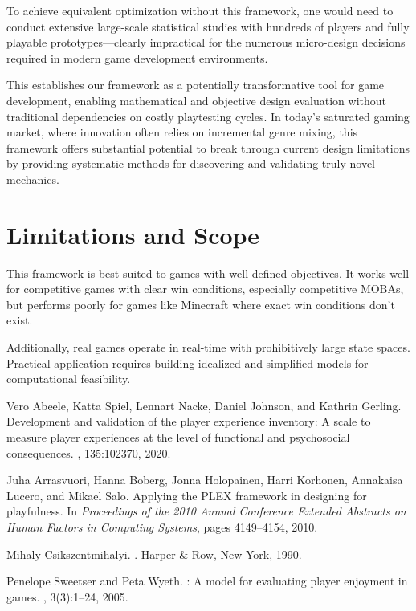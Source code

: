 \documentclass{article}
\begin{document}
To achieve equivalent optimization without this framework, one would need to conduct extensive large-scale statistical studies with hundreds of players and fully playable prototypes---clearly impractical for the numerous micro-design decisions required in modern game development environments.

This establishes our framework as a potentially transformative tool for game development, enabling mathematical and objective design evaluation without traditional dependencies on costly playtesting cycles. In today's saturated gaming market, where innovation often relies on incremental genre mixing, this framework offers substantial potential to break through current design limitations by providing systematic methods for discovering and validating truly novel mechanics.

\section{Limitations and Scope}

This framework is best suited to games with well-defined objectives. It works well for competitive games with clear win conditions, especially competitive MOBAs, but performs poorly for games like Minecraft where exact win conditions don't exist.

Additionally, real games operate in real-time with prohibitively large state spaces. Practical application requires building idealized and simplified models for computational feasibility.

\begin{thebibliography}{1}

Vero Abeele, Katta Spiel, Lennart Nacke, Daniel Johnson, and Kathrin Gerling.
\newblock Development and validation of the player experience inventory: A scale to measure player experiences at the level of functional and psychosocial consequences.
, 135:102370, 2020.

Juha Arrasvuori, Hanna Boberg, Jonna Holopainen, Harri Korhonen, Annakaisa Lucero, and Mikael Salo.
\newblock Applying the {PLEX} framework in designing for playfulness.
\newblock In {\em Proceedings of the 2010 Annual Conference Extended Abstracts on Human Factors in Computing Systems}, pages 4149--4154, 2010.

Mihaly Csikszentmihalyi.
.
\newblock Harper \& Row, New York, 1990.

Penelope Sweetser and Peta Wyeth.
: A model for evaluating player enjoyment in games.
, 3(3):1--24, 2005.

\end{thebibliography}
\end{document}
